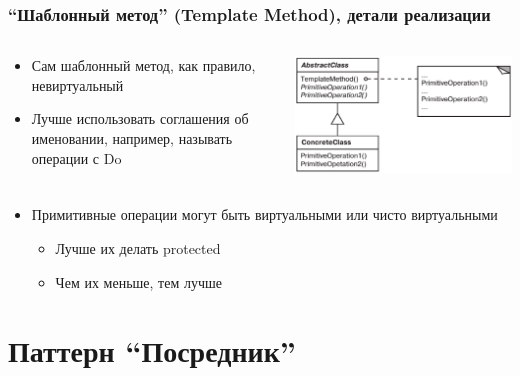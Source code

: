 \documentclass[xetex,mathserif,serif]{beamer}
\begin{document}
	\begin{frame}
		\frametitle{``Шаблонный метод'' (Template Method), детали реализации}
		\begin{columns}
			\begin{column}{0.5\textwidth}
				\begin{itemize}
					\item Сам шаблонный метод, как правило, невиртуальный
					\item Лучше использовать соглашения об именовании, например, называть операции с Do
				\end{itemize}
			\end{column}
			\begin{column}{0.4\textwidth}
				\begin{center}
					\includegraphics[width=\textwidth]{templateMethod.png}
				\end{center}
			\end{column}
		\end{columns}
		\begin{itemize}
			\item Примитивные операции могут быть виртуальными или чисто виртуальными
			\begin{itemize}
				\item Лучше их делать protected
				\item Чем их меньше, тем лучше
			\end{itemize}
		\end{itemize}
	\end{frame}

	\section{Паттерн ``Посредник''}
\end{document}

